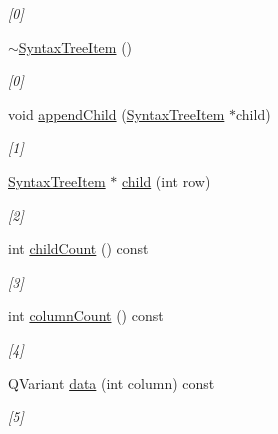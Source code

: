 \begin{DoxyCompactItemize}
\begin{DoxyCompactList}\small\item\em \mbox{[}0\mbox{]} \item\end{DoxyCompactList}\item 
\hyperlink{class_syntax_tree_item_a4b47e4cf1d8220a047bd08cc523bfcf0}{$\sim$SyntaxTreeItem} ()
\begin{DoxyCompactList}\small\item\em \mbox{[}0\mbox{]} \item\end{DoxyCompactList}\item 
void \hyperlink{class_syntax_tree_item_ac1652adb738637786cb0dbb6a901f7f6}{appendChild} (\hyperlink{class_syntax_tree_item}{SyntaxTreeItem} $\ast$child)
\begin{DoxyCompactList}\small\item\em \mbox{[}1\mbox{]} \item\end{DoxyCompactList}\item 
\hyperlink{class_syntax_tree_item}{SyntaxTreeItem} $\ast$ \hyperlink{class_syntax_tree_item_ae110758789d762cd3b52692c749f83fe}{child} (int row)
\begin{DoxyCompactList}\small\item\em \mbox{[}2\mbox{]} \item\end{DoxyCompactList}\item 
int \hyperlink{class_syntax_tree_item_a7d15159ee843581f0bdf6f7bae1bbae7}{childCount} () const 
\begin{DoxyCompactList}\small\item\em \mbox{[}3\mbox{]} \item\end{DoxyCompactList}\item 
int \hyperlink{class_syntax_tree_item_a9aeb4efa3d2c65e5c17ffafb80e6068c}{columnCount} () const 
\begin{DoxyCompactList}\small\item\em \mbox{[}4\mbox{]} \item\end{DoxyCompactList}\item 
QVariant \hyperlink{class_syntax_tree_item_aa3b2608b973c5296bed654229a18377c}{data} (int column) const 
\begin{DoxyCompactList}\small\item\em \mbox{[}5\mbox{]} \item\end{DoxyCompactList}\item 

\end{DoxyCompactItemize}
